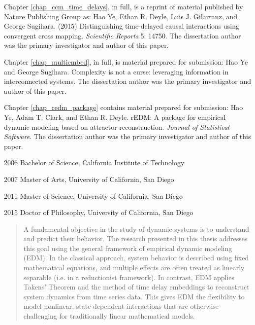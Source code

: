 \documentclass[12pt,chapterheads]{ucsd}
\begin{document}
\begin{frontmatter}
\begin{acknowledgements}
Chapter \ref{chap_ccm_time_delays}, in full, is a reprint of material published by Nature Publishing Group as: Hao Ye, Ethan R. Deyle, Luis J. Gilarranz, and George Sugihara. (2015) Distinguishing time-delayed causal interactions using convergent cross mapping. \emph{Scientific Reports} 5: 14750. The dissertation author was the primary investigator and author of this paper.

Chapter \ref{chap_multiembed}, in full, is material prepared for submission: Hao Ye and George Sugihara. Complexity is not a curse: leveraging information in interconnected systems. The dissertation author was the primary investigator and author of this paper.

Chapter \ref{chap_redm_package} contains material prepared for submission: Hao Ye, Adam T. Clark, and Ethan R. Deyle. rEDM: A package for empirical dynamic modeling based on attractor reconstruction. \emph{Journal of Statistical Software}. The dissertation author was the primary investigator and author of this paper.

\end{acknowledgements}

\begin{vitapage}
\begin{vita}
\item[2006] Bachelor of Science, California Institute of Technology
\item[2007] Master of Arts, University of California, San Diego
\item[2011] Master of Science, University of California, San Diego
\item[2015] Doctor of Philosophy, University of California, San Diego 
\end{vita}
\end{vitapage}


\begin{abstract}

A fundamental objective in the study of dynamic systems is to understand and predict their behavior.  The research presented in this thesis addresses this goal using the general framework of empirical dynamic modeling (EDM). In the classical approach, system behavior is described using fixed mathematical equations, and multiple effects are often treated as linearly separable (i.e. in a reductionist framework). In contrast, EDM applies Takens' Theorem and the method of time delay embeddings to reconstruct system dynamics from time series data. This gives EDM the flexibility to model nonlinear, state-dependent interactions that are otherwise challenging for traditionally linear mathematical models.


\end{abstract}
\end{frontmatter}
\end{document}
